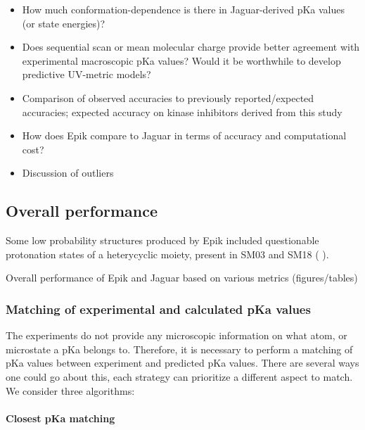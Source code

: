 \documentclass[9pt,lineno,final]{elife}
\begin{document}
\begin{itemize}
	\item How much conformation-dependence is there in Jaguar-derived pKa values (or state energies)?
	\item Does sequential scan or mean molecular charge provide better agreement with experimental macroscopic pKa values? Would it be worthwhile to develop predictive UV-metric models?
	\item Comparison of observed accuracies to previously reported/expected accuracies; expected accuracy on kinase inhibitors derived from this study
	\item How does Epik compare to Jaguar in terms of accuracy and computational cost?
	\item Discussion of outliers
\end{itemize}




\subsection{Overall performance}

Some low probability structures produced by Epik included questionable protonation states of a heterycyclic moiety, present in SM03 and SM18 ( ). 



Overall performance of Epik and Jaguar based on various metrics (figures/tables)
\subsubsection {Matching of experimental and calculated pKa values}


The experiments do not provide any microscopic information on what atom, or microstate a pKa belongs to.
%
Therefore, it is necessary to perform a matching of pKa values between experiment and predicted pKa values.
%
There are several ways one could go about this, each strategy can prioritize a different aspect to match.
%
We consider three algorithms:
\paragraph{Closest pKa matching}
%
\end{document}
